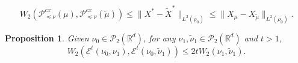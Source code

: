 \documentclass[10pt,a4paper]{amsart}
\newtheorem{proposition}{Proposition}
\def\mc#1{\mathcal{#1}}
\begin{document}
\begin{equation}\label{eq:stabproj}
W_2(\mathscr{P}_{\preceq \nu}^{cx} (\mu),\mathscr{P}_{\preceq \nu}^{cx} (\tilde{\mu}))\leq \|X^* - \tilde{X}^*\|_{L^2(\rho_0)} \leq \| X_\mu - X_{\tilde{\mu}}\|_{L^2(\rho_0)}.
\end{equation}

\begin{proposition}\label{prop:extralip} Given  $\nu_0 \in \mc{P}_2(\mathbb{R}^d)$, for any $\nu_1, \tilde{\nu}_1\in\mc{P}_2(\mathbb{R}^d)$ and $t>1$,
\begin{equation}\label{eq:extralip}
W_2(\mathscr{E}^t(\nu_0,\nu_1),\mathscr{E}^t(\nu_0,\tilde{\nu}_1)) \leq 2t W_2(\nu_1,\tilde{\nu}_1).
\end{equation}
\end{proposition}
\end{document}
